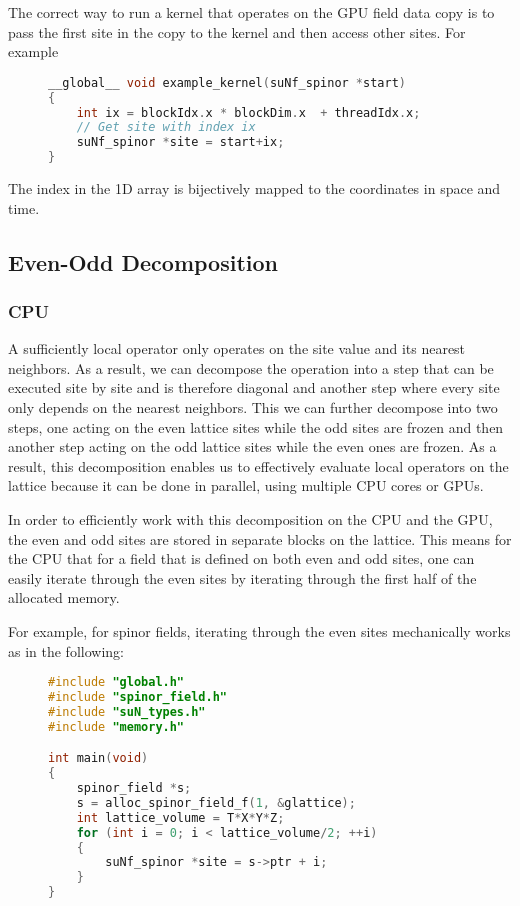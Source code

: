 \documentclass[12pt]{article}
\begin{document}
The correct way to run a kernel that operates on the GPU field data copy is to pass the first site in the copy to the kernel and then access other sites. For example

\begin{figure}[H]
\begin{lstlisting}[caption=Example for kernel,language=C]
__global__ void example_kernel(suNf_spinor *start)
{
    int ix = blockIdx.x * blockDim.x  + threadIdx.x;
    // Get site with index ix
    suNf_spinor *site = start+ix;
}
\end{lstlisting}
\end{figure}

The index in the 1D array is bijectively mapped to the coordinates in space and time.

\subsection*{Even-Odd Decomposition}
\subsubsection*{CPU}
A sufficiently local operator only operates on the site value and its nearest neighbors. %
As a result, we can decompose the operation into a step that can be executed site by site and is therefore diagonal and another step where every site only depends on the nearest neighbors. This we can further decompose into two steps, one acting on the even lattice sites while the odd sites are frozen and then another step acting on the odd lattice sites while the even ones are frozen. As a result, this decomposition enables us to effectively evaluate local operators on the lattice because it can be done in parallel, using multiple CPU cores or GPUs. \par
In order to efficiently work with this decomposition on the CPU and the GPU, the even and odd sites are stored in separate blocks on the lattice. This means for the CPU that for a field that is defined on both even and odd sites, one can easily iterate through the even sites by iterating through the first half of the allocated memory.

For example, for spinor fields, iterating through the even sites mechanically works as in the following:
\begin{figure}[H]
\begin{lstlisting}[caption=CPU Iterate through even sites,language=C]
#include "global.h"
#include "spinor_field.h"
#include "suN_types.h"
#include "memory.h"

int main(void)
{
    spinor_field *s;
    s = alloc_spinor_field_f(1, &glattice);
    int lattice_volume = T*X*Y*Z;
    for (int i = 0; i < lattice_volume/2; ++i)
    {
        suNf_spinor *site = s->ptr + i;
    }
}
\end{lstlisting}
\end{figure}
\end{document}

